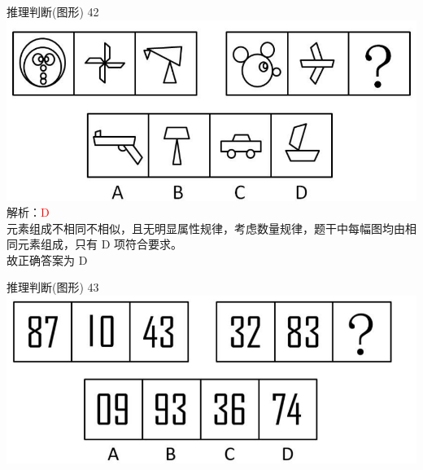 \documentclass[aspectratio=169]{beamer}
\begin{document}
\begin{frame}[t]{推理判断(图形)}
    42\\
    \includegraphics[scale=0.25]{42}\\ 
    解析：\textcolor{red}{D}\\
    元素组成不相同不相似，且无明显属性规律，考虑数量规律，题干中每幅图均由相同元素组成，只有
    D 项符合要求。\\
    故正确答案为 D\\
\end{frame}

\begin{frame}[t]{推理判断(图形)}
    43\\
    \includegraphics[scale=0.25]{43}\\ 
\end{frame}
\end{document}
